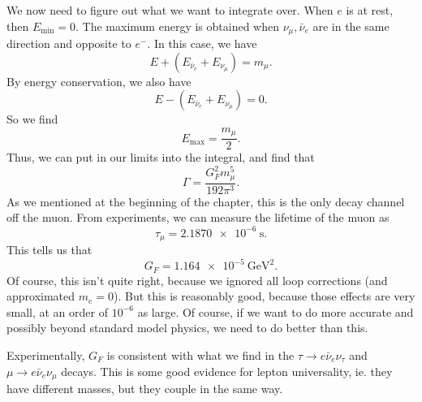 \documentclass[a4paper]{article}
\begin{document}
We now need to figure out what we want to integrate over. When $e$ is at rest, then $E_{\mathrm{min}} = 0$. The maximum energy is obtained when $\nu_\mu, \bar{\nu}_e$ are in the same direction and opposite to $e^-$. In this case, we have
\[
  E + (E_{\bar{\nu}_e} + E_{\nu_\mu}) = m_\mu.
\]
By energy conservation, we also have
\[
  E - (E_{\bar{\nu}_e} + E_{\nu_\mu}) = 0.
\]
So we find
\[
  E_{\mathrm{max}} = \frac{m_\mu}{2}.
\]
Thus, we can put in our limits into the integral, and find that %
\[
  \Gamma = \frac{G_F^2 m_\mu^5}{192 \pi^3}.
\]
As we mentioned at the beginning of the chapter, this is the only decay channel off the muon. From experiments, we can measure the lifetime of the muon as
\[
  \tau_{\mu} = \SI{2.1870e-6}{\second}.
\]
This tells us that
\[
  G_F = \SI{1.164e-5}{\giga\electronvolt\squared}.
\]
Of course, this isn't quite right, because we ignored all loop corrections (and approximated $m_e = 0$). But this is reasonably good, because those effects are very small, at an order of $10^{-6}$ as large. Of course, if we want to do more accurate and possibly beyond standard model physics, we need to do better than this.

Experimentally, $G_F$ is consistent with what we find in the $\tau \to e \bar{\nu}_e \nu_\tau$ and $\mu \to e \bar{\nu}_e \nu_\mu$ decays. This is some good evidence for lepton universality, ie. they have different masses, but they couple in the same way.
\end{document}
